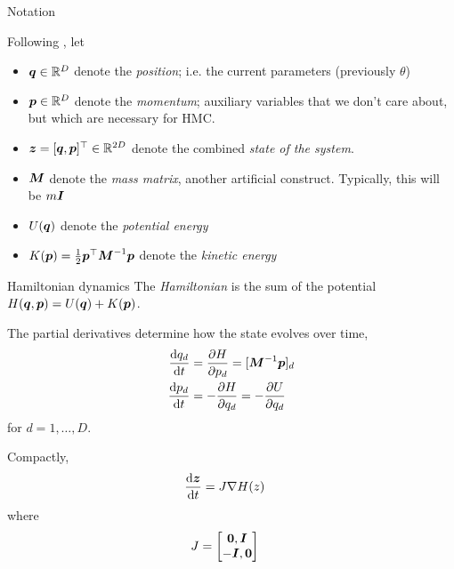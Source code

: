 \documentclass[aspectratio=169]{beamer}
\begin{document}
\begin{frame}{Notation}
    
    Following \citet{Neal2012-ev}, let
    
    \begin{itemize}
        \item $\boldsymbol{q} \in \mathbb{R}^D$ denote the \textit{position}; i.e. the current parameters (previously $\theta$)
        \item $\boldsymbol{p} \in \mathbb{R}^D$ denote the \textit{momentum}; auxiliary variables that we don't care about, but which are necessary for HMC.
        \item $\boldsymbol{z} = [\boldsymbol{q}, \boldsymbol{p}]^\top \in \mathbb{R}^{2D}$ denote the combined \textit{state of the system}.
        \item $\boldsymbol{M}$ denote the \textit{mass matrix}, another artificial construct. Typically, this will be $m \boldsymbol{I}$
        \item $U(\boldsymbol{q})$ denote the \textit{potential energy}
        \item $K(\boldsymbol{p}) = \frac{1}{2} \boldsymbol{p}^\top \boldsymbol{M}^{-1} \boldsymbol{p}$ denote the \textit{kinetic energy}
    \end{itemize}
    
\end{frame}

\begin{frame}{Hamiltonian dynamics}
    The \textit{Hamiltonian} is the sum of the potential $H(\boldsymbol{q}, \boldsymbol{p}) = U(\boldsymbol{q}) + K(\boldsymbol{p})$.
    
    The partial derivatives determine how the state evolves over time,
    \begin{align}
        \frac{\mathop{}\!\mathrm{d} q_d}{\mathop{}\!\mathrm{d} t} &= \frac{\partial H}{\partial p_d} = [\boldsymbol{M}^{-1} \boldsymbol{p}]_d \\
        \frac{\mathop{}\!\mathrm{d} p_d}{\mathop{}\!\mathrm{d} t} &= -\frac{\partial H}{\partial q_d} = -\frac{\partial  U}{\partial q_d}
    \end{align}
    for $d=1,\ldots, D$.
    
    Compactly,
    \begin{align}
        \frac{\mathop{}\!\mathrm{d} \boldsymbol{z}}{\mathop{}\!\mathrm{d} t} &= J \nabla H(z)
    \end{align}
    where 
    \begin{align}
        J &= \begin{bmatrix} \boldsymbol{0}, \boldsymbol{I} \\ -\boldsymbol{I}, \boldsymbol{0}
        \end{bmatrix}
    \end{align}
    
\end{frame}
\end{document}
